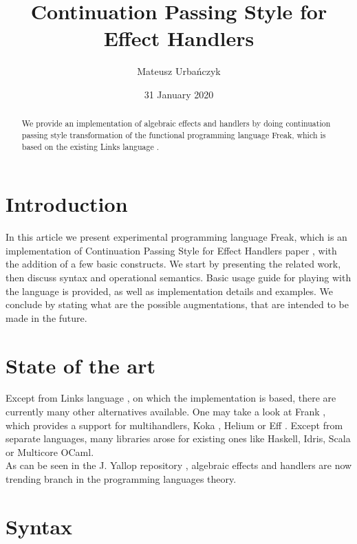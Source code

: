 \documentclass{article}
\title{Continuation Passing Style for Effect Handlers}
\author{Mateusz Urbańczyk}
\date{31 January 2020}
\theoremstyle{definition}
\theoremstyle{lemma}
\theoremstyle{observation}
\theoremstyle{theorem}
\begin{document}
\maketitle

\begin{abstract}

    We provide an implementation of algebraic effects and handlers by doing continuation
    passing style transformation of the functional programming language Freak,
    which is based on the existing Links language \cite{handlers-cps}.

\end{abstract}

\section{Introduction}

In this article we present experimental programming language Freak, which is an
implementation of Continuation Passing Style for Effect Handlers paper \cite{handlers-cps},
with the addition of a few basic constructs. We start by presenting the related work,
then discuss syntax and operational semantics. Basic usage guide for playing with
the language is provided, as well as implementation details and examples. We conclude
by stating what are the possible augmentations, that are intended to be made in the future.

\section{State of the art}

    Except from Links language \cite{handlers-cps}, on which the implementation
    is based, there are currently many other alternatives available. One may take
    a look at Frank \cite{frank}, which provides a support for multihandlers,
    Koka \cite{leijen-koka}, Helium \cite{helium} or Eff \cite{eff}. Except from
    separate languages, many libraries arose for existing ones like Haskell,
    Idris, Scala or Multicore OCaml. \\

    As can be seen in the J. Yallop repository \cite{effects-bibliography},
    algebraic effects and handlers are now trending branch in the programming languages theory.

\section{Syntax}
\end{document}
